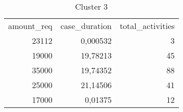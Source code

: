 \begin{table}[htbp]
  \centering
  \caption{Cluster 3}
    \begin{tabular}{rrr}
    \multicolumn{1}{l}{amount\_req} & \multicolumn{1}{l}{case\_duration} & \multicolumn{1}{l}{total\_activities} \\
    23112 & 0,000532 & 3 \\
    19000 & 19,78213 & 45 \\
    35000 & 19,74352 & 88 \\
    25000 & 21,14506 & 41 \\
    17000 & 0,01375 & 12 \\
    \end{tabular}%
  \label{tab:clust3}%
\end{table}%
